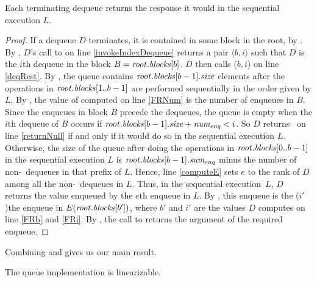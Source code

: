 \begin{lemma}\label{linearCorrect}
Each terminating dequeue returns the response it would in the sequential execution $L$.
\end{lemma}
\begin{proof}
If a dequeue $D$ terminates, it is contained in some block in the root, by .
By , $D$'s call to  on line \ref{invokeIndexDequeue}
returns a pair $\langle b,i\rangle$ such that $D$ is the $i$th dequeue in the block 
$B=\mbox{\textit{root}}.\mbox{\textit{blocks}}[b]$.
$D$ then calls ($b,i$) on line \ref{deqRest}.
By , the queue contains $\mbox{\textit{root}}.\mbox{\textit{blocks}}[b-1].\mbox{\textit{size}}$ elements
after the operations in $\mbox{\textit{root}}.\mbox{\textit{blocks}}[1..b-1]$ are performed sequentially 
in the order given by $L$.
By , the value of  computed on line \ref{FRNum}
is the number of enqueues in $B$.
Since the enqueues in block $B$ precede the dequeues,
the queue is empty when the $i$th dequeue of $B$ occurs if 
$\mbox{\textit{root}}.\mbox{\textit{blocks}}[b-1].\mbox{\textit{size}} + \mbox{\textit{num\textsubscript{enq}}} < i$.
So $D$ returns \nl\ on line \ref{returnNull} if and only if it would do so in the sequential
execution $L$.
Otherwise, the size of the queue after doing the operations in $\mbox{\textit{root}}.\mbox{\textit{blocks}}[0..b-1]$
in the sequential execution $L$ is $\mbox{\textit{root}}.\mbox{\textit{blocks}}[b-1].\mbox{\textit{sum\textsubscript{enq}}}$ minus
the number of non-\nl\ dequeues in that prefix of $L$.
Hence, line \ref{computeE} sets $e$ to the rank of $D$ among all the non-\nl\ dequeues in $L$.
Thus, in the sequential execution~$L$, $D$ returns the value enqueued by the $e$th enqueue in $L$.
By , this enqueue is the ($i'$)the enqueue 
in $E(\mbox{\textit{root}}.\mbox{\textit{blocks}}[b'])$, where
$b'$ and $i'$ are the values $D$ computes on line \ref{FRb} and \ref{FRi}.
By , the call to  returns the argument of the required enqueue.
\end{proof}

Combining  and  gives us our main result.

\begin{theorem}
The queue implementation is linearizable.
\end{theorem}
